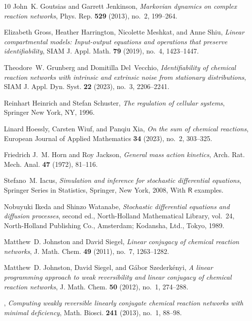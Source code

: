 \documentclass[10pt,a4paper]{amsart}
\theoremstyle{definition}
\theoremstyle{remark}
\theoremstyle{consequence}
\numberwithin{equation}{section}
\begin{document}
\begin{thebibliography}{10}
John~K. Goutsias and Garrett Jenkinson, \emph{Markovian dynamics on complex
  reaction networks}, Phys. Rep. \textbf{529} (2013), no.~2, 199--264.

Elizabeth Gross, Heather Harrington, Nicolette Meshkat, and Anne Shiu,
  \emph{Linear compartmental models: Input-output equations and operations that
  preserve identifiability}, SIAM J. Appl. Math. \textbf{79} (2019), no.~4,
  1423--1447.

Theodore~W. Grunberg and Domitilla Del~Vecchio, \emph{Identifiability of
  chemical reaction networks with intrinsic and extrinsic noise from stationary
  distributions}, SIAM J. Appl. Dyn. Syst. \textbf{22} (2023), no.~3,
  2206--2241.

Reinhart Heinrich and Stefan Schuster, \emph{The regulation of cellular
  systems}, Springer New York, NY, 1996.

Linard Hoessly, Carsten Wiuf, and Panqiu Xia, \emph{On the sum of chemical
  reactions}, European Journal of Applied Mathematics \textbf{34} (2023),
  no.~2, 303--325.

Friedrich J.~M. Horn and Roy Jackson, \emph{{General mass action kinetics}},
  Arch. Rat. Mech. Anal. \textbf{47} (1972), 81--116.

Stefano~M. Iacus, \emph{Simulation and inference for stochastic differential
  equations}, Springer Series in Statistics, Springer, New York, 2008, With
  $\mathsf{R}$ examples. 

Nobuyuki Ikeda and Shinzo Watanabe, \emph{Stochastic differential equations and
  diffusion processes}, second ed., North-Holland Mathematical Library,
  vol.~24, North-Holland Publishing Co., Amsterdam; Kodansha, Ltd., Tokyo,
  1989. 

Matthew~D. Johnston and David Siegel, \emph{Linear conjugacy of chemical
  reaction networks}, J. Math. Chem. \textbf{49} (2011), no.~7, 1263--1282.

Matthew~D. Johnston, David Siegel, and G{\'a}bor Szederk{\'e}nyi, \emph{A
  linear programming approach to weak reversibility and linear conjugacy of
  chemical reaction networks}, J. Math. Chem. \textbf{50} (2012), no.~1,
  274--288.

\bysame, \emph{Computing weakly reversible linearly conjugate chemical reaction
  networks with minimal deficiency}, Math. Biosci. \textbf{241} (2013), no.~1,
  88--98.


\end{thebibliography}
\end{document}
